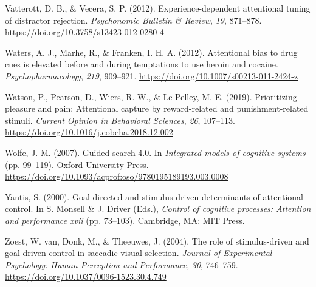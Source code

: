 \documentclass[man, a4paper, noextraspace, 11pt,floatsintext]{apa6}
\theoremstyle{definition}
\theoremstyle{definition}
\theoremstyle{definition}
\theoremstyle{remark}
\begin{document}
\hypertarget{ref-Vatterott2012}{}
Vatterott, D. B., \& Vecera, S. P. (2012). Experience-dependent
attentional tuning of distractor rejection. \emph{Psychonomic Bulletin
\& Review}, \emph{19}, 871--878.
\url{https://doi.org/10.3758/s13423-012-0280-4}

\hypertarget{ref-Waters2012}{}
Waters, A. J., Marhe, R., \& Franken, I. H. A. (2012). Attentional bias
to drug cues is elevated before and during temptations to use heroin and
cocaine. \emph{Psychopharmacology}, \emph{219}, 909--921.
\url{https://doi.org/10.1007/s00213-011-2424-z}

\hypertarget{ref-Watson2019}{}
Watson, P., Pearson, D., Wiers, R. W., \& Le Pelley, M. E. (2019).
Prioritizing pleasure and pain: Attentional capture by reward-related
and punishment-related stimuli. \emph{Current Opinion in Behavioral
Sciences}, \emph{26}, 107--113.
\url{https://doi.org/10.1016/j.cobeha.2018.12.002}

\hypertarget{ref-Wolfe2007}{}
Wolfe, J. M. (2007). Guided search 4.0. In \emph{Integrated models of
cognitive systems} (pp. 99--119). Oxford University Press.
\url{https://doi.org/10.1093/acprof:oso/9780195189193.003.0008}

\hypertarget{ref-Yantis2000}{}
Yantis, S. (2000). Goal-directed and stimulus-driven determinants of
attentional control. In S. Monsell \& J. Driver (Eds.), \emph{Control of
cognitive processes: Attention and performance xvii} (pp. 73--103).
Cambridge, MA: MIT Press.

\hypertarget{ref-VanZoest2004}{}
Zoest, W. van, Donk, M., \& Theeuwes, J. (2004). The role of
stimulus-driven and goal-driven control in saccadic visual selection.
\emph{Journal of Experimental Psychology: Human Perception and
Performance}, \emph{30}, 746--759.
\url{https://doi.org/10.1037/0096-1523.30.4.749}

\endgroup
\end{document}
